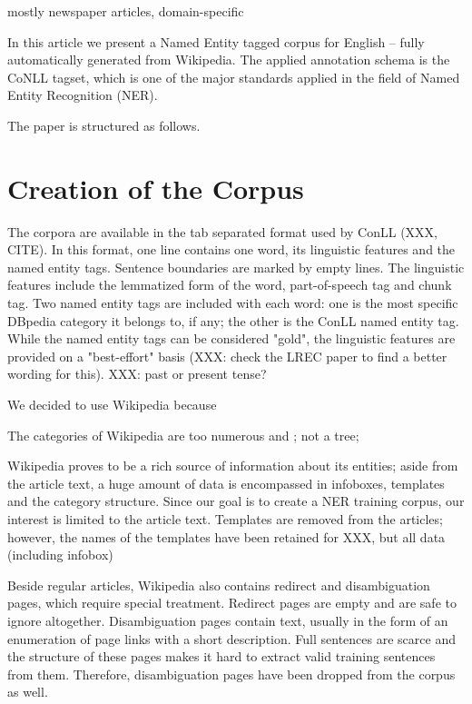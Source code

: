 \documentclass[11pt]{article}
\begin{document}
mostly newspaper articles, domain-specific

In this article we present a Named Entity tagged corpus for English -- fully automatically generated from Wikipedia. 
The applied annotation schema is the CoNLL tagset, which is one of the major standards applied in the field of Named Entity Recognition (NER). 

The paper is structured as follows. 

\section{Creation of the Corpus}  %

The corpora are available in the tab separated format used by ConLL (XXX, CITE). In this format, one line contains one word, its linguistic features and the named entity tags. Sentence boundaries are marked by empty lines. The linguistic features include the lemmatized form of the word, part-of-speech tag and chunk tag. Two named entity tags are included with each word: one is the most specific DBpedia category it belongs to, if any; the other is the ConLL named entity tag. While the named entity tags can be considered "gold", the linguistic features are provided on a "best-effort" basis (XXX: check the LREC paper to find a better wording for this).
XXX: past or present tense?

We decided to use Wikipedia because

The categories of Wikipedia are too numerous and ; not a tree;

Wikipedia proves to be a rich source of information about its entities; aside from the article text, a huge amount of data is encompassed in infoboxes, templates and the category structure. Since our goal is to create a NER training corpus, our interest is limited to the article text. Templates are removed from the articles; however, the names of the templates have been retained for XXX, but all data (including infobox) 

Beside regular articles, Wikipedia also contains redirect and disambiguation pages, which require special treatment. Redirect pages are empty and are safe to ignore altogether. Disambiguation pages contain text, usually in the form of an enumeration of page links with a short description. Full sentences are scarce and the structure of these pages makes it hard to extract valid training sentences from them. Therefore, disambiguation pages have been dropped from the corpus as well.
\end{document}
